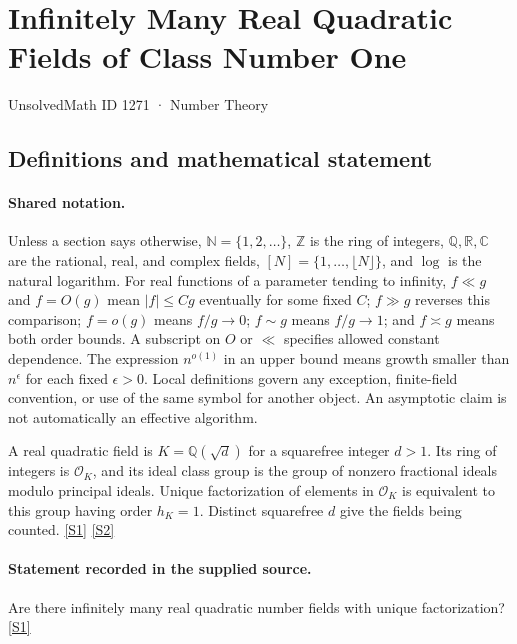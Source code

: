 \documentclass[11pt,a4paper]{article}
\newcommand{\N}{\mathbb{N}}
\newcommand{\Z}{\mathbb{Z}}
\newcommand{\Q}{\mathbb{Q}}
\newcommand{\R}{\mathbb{R}}
\newcommand{\C}{\mathbb{C}}
\newcommand{\sref}[2]{\hyperlink{source:#1:#2}{[S#2]}}
\begin{document}

\setcounter{section}{1270}

\section{Infinitely Many Real Quadratic Fields of Class Number One}\label{1271}

{\small\sffamily UnsolvedMath ID 1271 · Number Theory}

\subsection{Definitions and mathematical statement}

\paragraph{Shared notation.}Unless a section says otherwise, $\N=\{1,2,\ldots\}$,
$\Z$ is the ring of integers, $\Q,\R,\C$ are the rational, real, and complex
fields, $[N]=\{1,\ldots,\lfloor N\rfloor\}$, and $\log$ is the natural
logarithm. For real functions of a parameter tending to infinity,
$f\ll g$ and $f=O(g)$ mean $|f|\leq Cg$ eventually for some fixed $C$;
$f\gg g$ reverses this comparison; $f=o(g)$ means $f/g\to0$;
$f\sim g$ means $f/g\to1$; and $f\asymp g$ means both order bounds.
A subscript on $O$ or $\ll$ specifies allowed constant dependence.
The expression $n^{o(1)}$ in an upper bound means growth smaller than
$n^\epsilon$ for each fixed $\epsilon>0$. Local definitions govern any
exception, finite-field convention, or use of the same symbol for another
object. An asymptotic claim is not automatically an effective algorithm.



A real quadratic field is $K=\Q(\sqrt d)$ for a squarefree integer $d>1$. Its ring of integers is $\mathcal O_K$, and its ideal class group is the group of nonzero fractional ideals modulo principal ideals. Unique factorization of elements in $\mathcal O_K$ is equivalent to this group having order $h_K=1$. Distinct squarefree $d$ give the fields being counted. \sref{1271}{1} \sref{1271}{2}

\paragraph{Statement recorded in the supplied source.}
Are there infinitely many real quadratic number fields with unique factorization? \sref{1271}{1}
\end{document}
